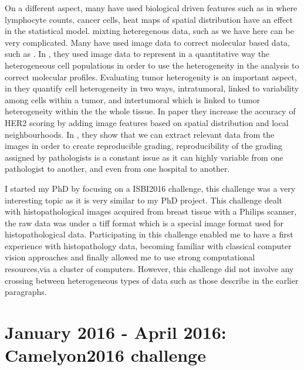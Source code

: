 \documentclass[a4paper,10pt]{article}
\begin{document}
On a different aspect, many have used biological driven features such as in \citet{yuan2012quantitative} where lymphocyte counts, cancer cells, heat maps of spatial distribution have an effect in the statistical model. mixting heteregenous data, such as we have here can be very complicated. Many have used image data to correct molecular based data, such as . In \cite{yuan2012quantitative}, they used image data to represent in a quantitative way the heterogeneous cell populations in order to use the heterogeneity in the analysis to correct molecular profiles. Evaluating tumor heterogenity is an important aspect, in \cite{potts2012evaluating} they quantify cell heterogeneity in two ways, intratumoral, linked to variability among cells within a tumor, and intertumoral which is linked to tumor heterogeneity within the the whole tissue. In \cite{potts2012evaluating} paper they increase the accuracy of HER2 scoring by adding image features based on spatial distribution and local neighbourhoods. In \cite{petushi2006large}, they show that we can extract relevant data from the images in order to create reproducible grading, reproducibility of the grading assigned by pathologists is a constant issue as it can highly variable from one pathologist to another, and even from one hospital to another. 										


I started my PhD by focusing on a ISBI2016 challenge, this challenge was a very interesting topic as it is very similar to my PhD project. This challenge dealt with histopathological images acquired from breast tissue with a Philips scanner, the raw data was under a tiff format which is a special image format used for histopathological data. Participating in this challenge enabled me to have a first experience with histopathology data, becoming familiar with classical computer vision approaches and finally allowed me to use strong computational resources,via a cluster of computers. However, this challenge did not involve any crossing between heterogeneous types of data such as those describe in the earlier paragraphs.

\section{January 2016 - April 2016: Camelyon2016 challenge}
\end{document}
